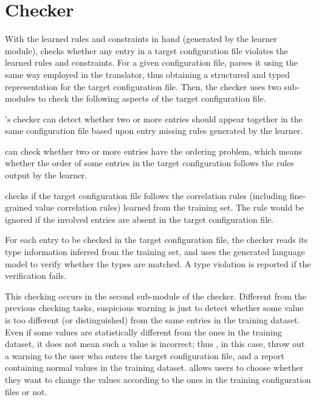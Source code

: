 
\section{Checker}
\label{sec-checker}

With the learned rules and constraints in hand (generated
by the learner module),
\app checks whether any entry in a target configuration file
violates the learned rules and constraints.
For a given configuration file, \app parses it using the same
way employed in the translator, thus obtaining a structured
and typed representation for the target configuration file.
Then, the checker uses two sub-modules to check the
following aspects of the target configuration file.

\app 's checker can detect whether two or more entries should
appear together in the same configuration file based upon
entry missing rules generated by the learner.

\app can check whether two or more entries have the ordering 
problem, which means whether the order of some entries in the 
target configuration follows the rules output by the learner.

\app checks if the target configuration file follows the 
correlation rules (including fine-grained value correlation rules)
learned from the training set. The rule would be ignored 
if the involved entries are absent in the target configuration file.

For each entry to be checked in the target configuration file,
the checker reads its type information inferred from the training set,
and uses the generated language model to verify whether the types
are matched. A type violation is reported if the verification
fails.

This checking occurs in the second sub-module of the checker.
Different from the previous checking tasks,
suspicious warning is just to detect whether some value
is too different (or distinguished) from the same entries in the
training dataset. Even if some values are statistically different
from the ones in the training dataset, 
it does not mean such a value is incorrect;
thus \app, in this case, throw out a warning to the user who
enters the target configuration file, and a report containing 
normal values in the training dataset.
\app allows users to choose whether they want to change 
the values according to the ones in the training configuration
files or not.
